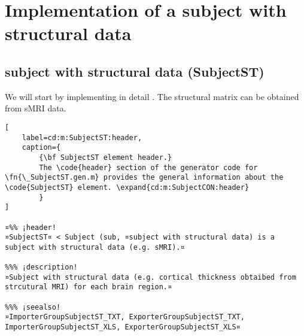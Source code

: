 \documentclass{tufte-handout}
\begin{document}
\clearpage
\section{Implementation of a subject with structural data}

\subsection{subject with structural data (SubjectST)}

We will start by implementing in detail . The structural matrix can be obtained from sMRI data.

\begin{lstlisting}[
	label=cd:m:SubjectST:header,
	caption={
		{\bf SubjectST element header.}
		The \code{header} section of the generator code for \fn{\_SubjectST.gen.m} provides the general information about the \code{SubjectST} element. \expand{cd:m:SubjectCON:header}
		}
]

¤%% ¡header!
¤SubjectST¤ < Subject (sub, ¤subject with structural data) is a subject with structural data (e.g. sMRI).¤

%%% ¡description!
¤Subject with structural data (e.g. cortical thickness obtaibed from strcutural MRI) for each brain region.¤

%%% ¡seealso!
¤ImporterGroupSubjectST_TXT, ExporterGroupSubjectST_TXT, ImporterGroupSubjectST_XLS, ExporterGroupSubjectST_XLS¤
\end{lstlisting}
\end{document}
